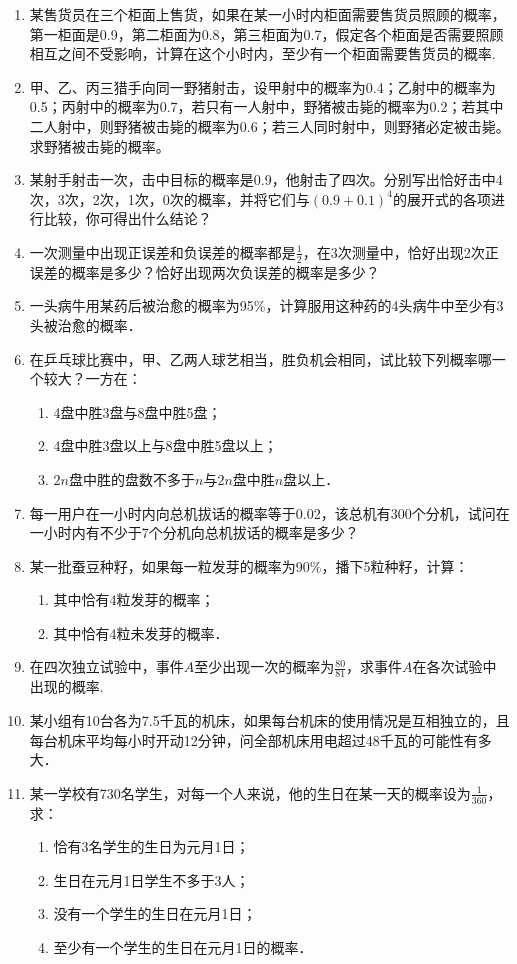 \begin{enumerate}
\item 某售货员在三个柜面上售货，如果在某一小时内柜面需要售货员照顾的概率，第一柜面是0.9，第二柜面为0.8，第三柜面为0.7，假定各个柜面是否需要照顾相互之间不受影响，计算在这个小时内，至少有一个柜面需要售货员的概率.
\item 甲、乙、丙三猎手向同一野猪射击，设甲射中的概率为0.4；乙射中的概率为0.5；丙射中的概率为0.7，若只有一人射中，野猪被击毙的概率为0.2；若其中二人射中，则野猪被击毙的概率为0.6；若三人同时射中，则野猪必定被击毙。求野猪被击毙的概率。
\item 某射手射击一次，击中目标的概率是0.9，他射击了四次。分别写出恰好击中4次，3次，2次，1次，0次的概率，并将它们与$(0.9+0.1)^4$的展开式的各项进行比较，你可得出什么结论？
\item 一次测量中出现正误差和负误差的概率都是$\frac{1}{2}$，在3次测量中，恰好出现2次正误差的概率是多少？恰好出现两次负误差的概率是多少？
\item 一头病牛用某药后被治愈的概率为95\%，计算服用这种药的4头病牛中至少有3头被治愈的概率．
\item 在乒乓球比赛中，甲、乙两人球艺相当，胜负机会相同，试比较下列概率哪一个较大？一方在：
\begin{enumerate}[(1)]
\item 4盘中胜3盘与8盘中胜5盘；
\item 4盘中胜3盘以上与8盘中胜5盘以上；
\item $2n$盘中胜的盘数不多于$n$与$2n$盘中胜$n$盘以上．
\end{enumerate}

\item 每一用户在一小时内向总机拔话的概率等于0.02，该总机有300个分机，试问在一小时内有不少于7个分机向总机拔话的概率是多少？

\item 某一批蚕豆种籽，如果每一粒发芽的概率为90\%，播下5粒种籽，计算：
\begin{enumerate}[(1)]
    \item 其中恰有4粒发芽的概率；
    \item 其中恰有4粒未发芽的概率．
\end{enumerate}

\item 在四次独立试验中，事件$A$至少出现一次的概率为$\frac{80}{81}$，求事件$A$在各次试验中出现的概率.
\item 某小组有10台各为7.5千瓦的机床，如果每台机床的使用情况是互相独立的，且每台机床平均每小时开动12分钟，问全部机床用电超过48千瓦的可能性有多大．
\item 某一学校有730名学生，对每一个人来说，他的生日在某一天的概率设为$\frac{1}{360}$，求：
\begin{enumerate}[(1)]
\item 恰有3名学生的生日为元月1日；
\item 生日在元月1日学生不多于3人；
\item 没有一个学生的生日在元月1日；
\item 至少有一个学生的生日在元月1日的概率．
\end{enumerate}


\end{enumerate}
